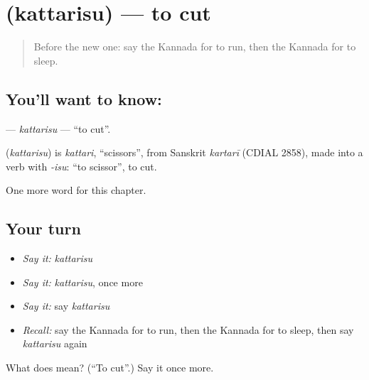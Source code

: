 \section[\texorpdfstring{\kn{ಕತ್ತರಿಸು} (kattarisu)}{ಕತ್ತರಿಸು (kattarisu)}]{ (kattarisu) — to cut}

\label{lesson:KA-C147-kattarisu}



\begin{quote}
Before the new one: say the Kannada for to run, then the Kannada for to sleep.
\end{quote}

\subsection*{You'll want to know: }
\textbf{} — \emph{kattarisu} — \textquotedblleft{}to cut\textquotedblright{}.

\begin{cousinweb}
\textbf{} (\emph{kattarisu}) is \emph{kattari}, \textquotedblleft{}scissors\textquotedblright{}, from Sanskrit \emph{kartarī} (CDIAL 2858), made into a verb with \emph{-isu}: \textquotedblleft{}to scissor\textquotedblright{}, to cut.
\end{cousinweb}

\begin{grammarlens}[title={What you've built}]
One more word for this chapter.
\end{grammarlens}

\subsection*{Your turn}
\begin{itemize}
\raggedright
  \item \emph{Say it:} \emph{kattarisu}
  \item \emph{Say it:} \emph{kattarisu}, once more
  \item \emph{Say it:} say \emph{kattarisu}
  \item \emph{Recall:} say the Kannada for to run, then the Kannada for to sleep, then say \emph{kattarisu} again
\end{itemize}

\begin{tcolorbox}[breakable,colback=teal!4,colframe=teal!35!black,title={Before you move on}]
What does  mean? (\textquotedblleft{}To cut\textquotedblright{}.) Say it once more.
\end{tcolorbox}
